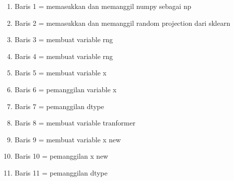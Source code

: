 \begin {enumerate}
\item Baris 1 = memasukkan dan memanggil numpy sebagai np
\item Baris 2 = memasukkan dan memanggil random projection dari sklearn
\item Baris 3 = membuat variable rng
\item Baris 4 = membuat variable rng
\item Baris 5 = membuat variable x
\item Baris 6 = pemanggilan variable x
\item Baris 7 = pemanggilan dtype
\item Baris 8 = membuat variable tranformer
\item Baris 9 = membuat variable x new
\item Baris 10 = pemanggilan x new
\item Baris 11 = pemanggilan dtype
\end {enumerate}

